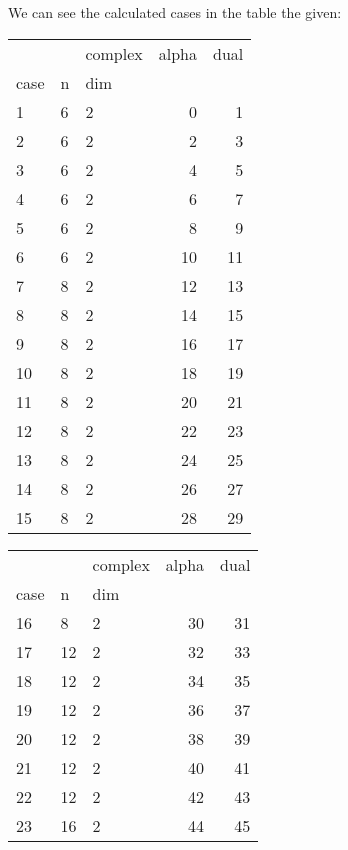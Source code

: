 \documentclass{article}
\begin{document}
\par We can see the calculated cases in the table the given:
\begin{center}
\begin{tabular}{lllrr}
\toprule
&  & complex & alpha & dual \\
case & n & dim &  &  \\
\midrule
1 & 6 & 2 & 0 & 1 \\
\cline{1-5} \cline{2-5}
2 & 6 & 2 & 2 & 3 \\
\cline{1-5} \cline{2-5}
3 & 6 & 2 & 4 & 5 \\
\cline{1-5} \cline{2-5}
4 & 6 & 2 & 6 & 7 \\
\cline{1-5} \cline{2-5}
5 & 6 & 2 & 8 & 9 \\
\cline{1-5} \cline{2-5}
6 & 6 & 2 & 10 & 11 \\
\cline{1-5} \cline{2-5}
7 & 8 & 2 & 12 & 13 \\
\cline{1-5} \cline{2-5}
8 & 8 & 2 & 14 & 15 \\
\cline{1-5} \cline{2-5}
9 & 8 & 2 & 16 & 17 \\
\cline{1-5} \cline{2-5}
10 & 8 & 2 & 18 & 19 \\
\cline{1-5} \cline{2-5}
11 & 8 & 2 & 20 & 21 \\
\cline{1-5} \cline{2-5}
12 & 8 & 2 & 22 & 23 \\
\cline{1-5} \cline{2-5}
13 & 8 & 2 & 24 & 25 \\
\cline{1-5} \cline{2-5}
14 & 8 & 2 & 26 & 27 \\
\cline{1-5} \cline{2-5}
15 & 8 & 2 & 28 & 29 \\
\cline{1-5} \cline{2-5}
\bottomrule
\end{tabular}
\begin{tabular}{lllrr}
\toprule
&  & complex & alpha & dual \\
case & n & dim &  &  \\
\midrule
16 & 8 & 2 & 30 & 31 \\
\cline{1-5} \cline{2-5}
17 & 12 & 2 & 32 & 33 \\
\cline{1-5} \cline{2-5}
18 & 12 & 2 & 34 & 35 \\
\cline{1-5} \cline{2-5}
19 & 12 & 2 & 36 & 37 \\
\cline{1-5} \cline{2-5}
20 & 12 & 2 & 38 & 39 \\
\cline{1-5} \cline{2-5}
21 & 12 & 2 & 40 & 41 \\
\cline{1-5} \cline{2-5}
22 & 12 & 2 & 42 & 43 \\
\cline{1-5} \cline{2-5}
23 & 16 & 2 & 44 & 45 \\

\end{tabular}
\end{center}
\end{document}
